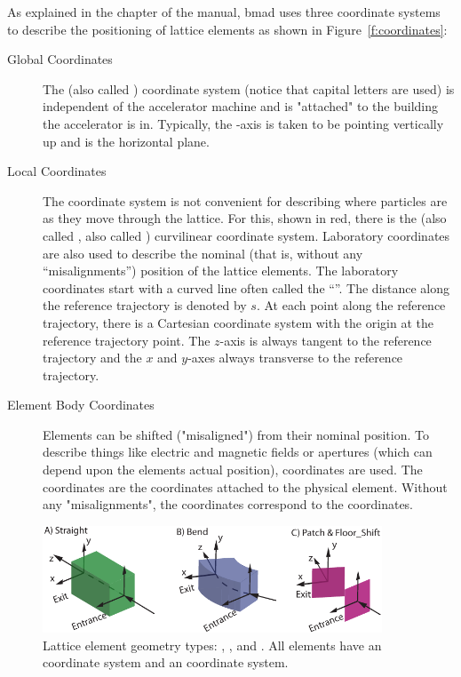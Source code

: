 \documentclass{hitec}     %
\begin{document}
As explained in the  chapter of the \bmad manual, bmad uses three coordinate
systems to describe the positioning of lattice elements as shown in Figure~\ref{f:coordinates}:
\begin{description}
\item[Global Coordinates] \Newline
The   (also called ) coordinate system (notice that capital
letters are used) is independent of the accelerator machine and is "attached" to the building the
accelerator is in. Typically, the -axis is taken to be pointing vertically up and 
is the horizontal plane.
%
\item[Local Coordinates] \Newline
The  coordinate system is not convenient for describing where particles are as they move
through the lattice. For this, shown in red, there is the  (also called ,
also called ) curvilinear coordinate system. Laboratory coordinates are also used to
describe the nominal (that is, without any ``misalignments'') position of the lattice elements. The
laboratory coordinates start with a curved line often called the ``''. The
distance along the reference trajectory is denoted by $s$. At each point along the reference
trajectory, there is a Cartesian  coordinate system with the origin at the reference
trajectory point. The $z$-axis is always tangent to the reference trajectory and the $x$ and
$y$-axes always transverse to the reference trajectory.
%
\item[Element Body Coordinates] \Newline
Elements can be shifted ("misaligned") from their nominal position. To describe things like electric
and magnetic fields or apertures (which can depend upon the elements actual position), 
coordinates are used.  The  coordinates are the coordinates attached to the
physical element. Without any "misalignments", the  coordinates correspond to the
 coordinates.
\end{description}

\begin{figure}[tb]
  \centering
  \includegraphics[width=0.9\textwidth]{element-coord-frame.pdf}
  \caption{Lattice element geometry types: , , and . All elements have an 
 coordinate system and an  coordinate system.}
  \label{f:body.types}
\end{figure}
\end{document}
